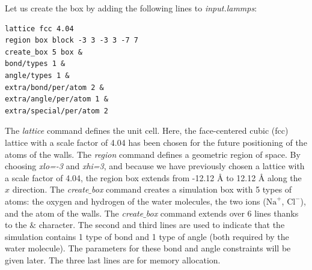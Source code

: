 \documentclass[9pt,tutorial]{livecoms}
\begin{document}
Let us create the box by adding the following lines to \textit{input.lammps}:
{\normalsize \begin{verbatim}
lattice fcc 4.04
region box block -3 3 -3 3 -7 7
create_box 5 box &
bond/types 1 &
angle/types 1 &
extra/bond/per/atom 2 &
extra/angle/per/atom 1 &
extra/special/per/atom 2
\end{verbatim}}
The \textit{lattice} command defines the unit cell. Here, the face-centered cubic (fcc) lattice with a scale factor of
4.04 has been chosen for the future positioning of the atoms of the walls. The \textit{region} command defines a geometric
region of space. By choosing \textit{xlo=-3} and \textit{xhi=3}, and because we have previously chosen a lattice with a scale
factor of 4.04, the region box extends from -12.12 Å to 12.12 Å along the $x$ direction. The \textit{create$\_$box} command creates a simulation box with 5 types of atoms: the oxygen and hydrogen of the water molecules, the two ions ($\text{Na}^+$,
$\text{Cl}^-$), and the atom of the walls. The \textit{create$\_$box} command extends over 6 lines thanks to the $\&$ character. The second and third lines are used to indicate that the simulation contains 1 type of bond and 1 type of angle (both required by the water molecule). The parameters for these bond and angle constraints will be given later. The three last lines are for memory allocation.
\end{document}
